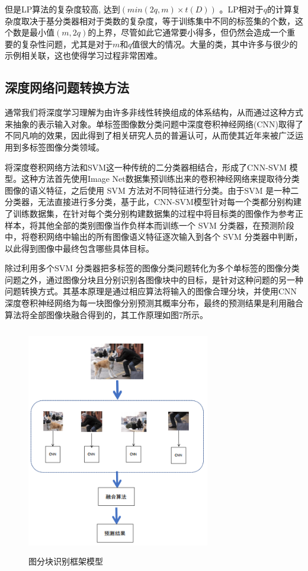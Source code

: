 但是LP算法的复杂度较高, 达到$(min(2q, m)\times t(D))$ 。LP相对于$q$的计算复杂度取决于基分类器相对于类数的复杂度，等于训练集中不同的标签集的个数，这个数是最小值$(m,2q)$的上界，尽管如此它通常要小得多，但仍然会造成一个重要的复杂性问题，尤其是对于$m$和$q$值很大的情况。大量的类，其中许多与很少的示例相关联，这也使得学习过程非常困难。

\subsection{深度网络问题转换方法}

通常我们将深度学习理解为由许多非线性转换组成的体系结构，从而通过这种方式来抽象的表示输入对象。单标签图像数分类问题中深度卷积神经网络(CNN)取得了不同凡响的效果，因此得到了相关研究人员的普遍认可，从而使其近年来被广泛运用到多标签图像分类领域。

将深度卷积网络方法和SVM这一种传统的二分类器相结合，形成了CNN-SVM 模型。这种方法首先使用Image Net数据集预训练出来的卷积神经网络来提取待分类图像的语义特征，之后使用 SVM 方法对不同特征进行分类。由于SVM 是一种二分类器，无法直接进行多分类，基于此，CNN-SVM模型针对每一个类都分别构建了训练数据集，在针对每个类分别构建数据集的过程中将目标类的图像作为参考正样本，将其他全部的类别图像当作负样本而训练一个 SVM 分类器，在预测阶段中，将卷积网络中输出的所有图像语义特征逐次输入到各个 SVM 分类器中判断，以此得到图像中最终包含哪些具体目标。

除过利用多个SVM 分类器把多标签的图像分类问题转化为多个单标签的图像分类问题之外，通过图像分块且分别识别各图像块中的目标，是针对这种问题的另一种问题转换方式。其基本原理是通过相应算法将输入的图像合理分块，并使用CNN深度卷积神经网络为每一块图像分别预测其概率分布，最终的预测结果是利用融合算法将全部图像块融合得到的，其工作原理如图7所示。

\begin{figure}[htbp!]
	\centering
	\includegraphics[width=8cm,height=10cm]{figures/p2-8.png}
	\caption{图分块识别框架模型}\label{fig:p2-8}
	\vspace{-1em}
\end{figure}

